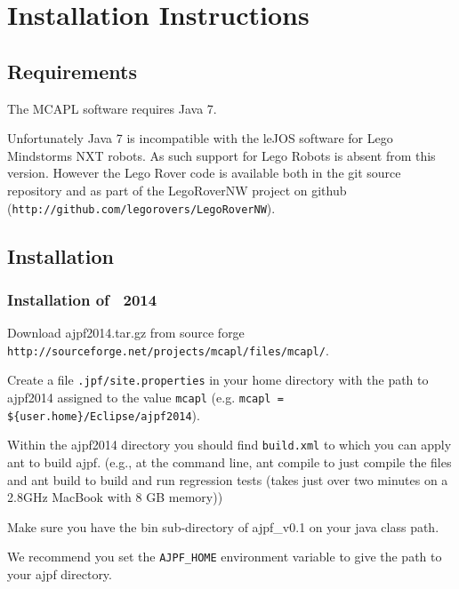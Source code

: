 \chapter{Installation Instructions}
\label{chap:installation}
\section{Requirements}

The MCAPL software requires Java 7.  

\begin{sloppypar}
Unfortunately Java 7 is incompatible with the leJOS software for Lego Mindstorms NXT robots.  As such support for Lego Robots is absent from this version.  However the Lego Rover code is available both in the git source repository and as part of the LegoRoverNW project on github (\texttt{http://github.com/legorovers/LegoRoverNW}).
\end{sloppypar}

\section{Installation}

\subsection{Installation of \ajpf\ 2014}

\begin{itemize}
\begin{sloppypar}
\item Download ajpf2014.tar.gz from source forge \texttt{http://sourceforge.net/projects/mcapl/files/mcapl/}.
\end{sloppypar}
\item Create a file \texttt{.jpf/site.properties} in your home directory with the path to ajpf2014 assigned to the value \texttt{mcapl} (e.g. \texttt{mcapl = \$\{user.home\}/Eclipse/ajpf2014}).
\item Within the ajpf2014 directory you should find \texttt{build.xml} to which you can apply ant to build ajpf. (e.g., at the command line, ant compile to just compile the files and ant build to build and run regression tests (takes just over two minutes on a 2.8GHz MacBook with 8 GB memory))
\item Make sure you have the bin sub-directory of ajpf\_v0.1 on your java class path.
\item We recommend you set the \texttt{AJPF\_HOME} environment variable to give the path to your ajpf directory.
\end{itemize}

